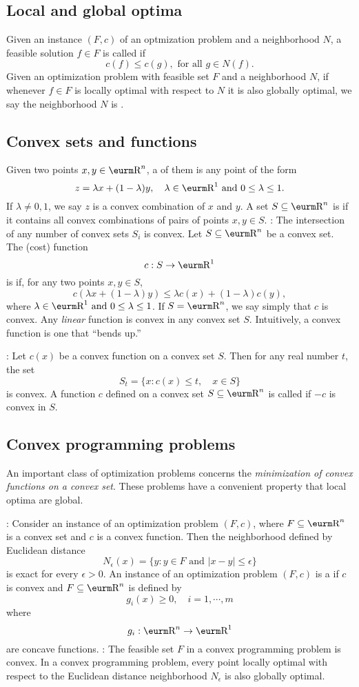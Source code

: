 \documentclass{myproc}
\begin{document}
\subsection{Local and global optima}
\bit
\w Given an instance $(F, c)$ of an optmization problem and a
neighborhood $N$, a feasible solution $f \in F$ is called  if  
	\[ c(f) \le c(g), \mbox{\ for all\ } g \in N(f). \]
\w Given an optimization problem with feasible set $F$ and a
neighborhood $N$, if whenever $f \in F$ is locally optimal with
respect to $N$ it is also globally optimal, we say the neighborhood
$N$ is . 
\eit
\subsection{Convex sets and functions}
\bit
\w Given two points $x, y \in \R^n$, a  of them
is any point of the form 
	\[ z = \lambda{x} + (1-\lambda)y,\quad \lambda \in \R^1 \mbox{\ and\ }
	0 \le \lambda \le 1.\]
	If $\lambda \ne 0, 1$, we say $z$ is a  convex
combination of $x$ and $y$. 
\w A set $S \subseteq \R^n$ is  if it contains all convex
combinations of pairs of points $x, y \in S$. 
: 
  The intersection of any number of convex sets $S_i$ is convex.
\w Let $S \subseteq \R^n$ be a convex set. The (cost) function
	\[ c: S \rightarrow \R^1 \]
is  if, for any two points $x, y \in S$,
\[ c(\lambda{x} + (1-\lambda)y) \le \lambda c(x) + (1-\lambda)c(y),\]
where $\lambda \in \R^1 \mbox{\ and\ } 0 \le \lambda \le 1$.
If $S = \R^n$, we say simply that $c$ is convex.
	\w Any {\em linear\/} function is convex in any convex set $S$.
	\w Intuitively, a convex function is one that ``bends up.''

: 
 Let $c(x)$ be a convex function on a convex set $S$. Then for any
real number $t$, the set  
\[S_t = \{x : c(x) \le t, \quad x \in S\}\]
is convex.
\w A function $c$ defined on a convex set $S \subseteq \R^n$ is called
 if $-c$ is convex in $S$.
\eit
\subsection{Convex programming problems}
\bit
\w An important class of optimization problems concerns the {\em
minimization of convex functions on a convex set\/}.
These problems have a convenient property that local optima
are global.

: 
Consider an instance of an optimization problem $(F, c)$, where
$F \subseteq \R^n$ is a convex set and $c$ is a convex function.
Then the neighborhood defined by Euclidean distance
\[ N_\epsilon(x) = \{y: y \in F \mbox{\ and\ } |x - y| \le
\epsilon\}\]
is exact for every $\epsilon > 0$.
\w An instance of an optimization problem $(F, c)$ is a  if $c$ is convex and $F \subseteq \R^n$ is
defined by
\[ g_i(x) \ge 0, \quad i = 1, \cdots, m\]
where
\[ g_i:\R^n \rightarrow \R^1\]
are concave functions.
:
 The feasible set $F$ in a convex programming problem is convex.
\w In a convex programming problem, every point locally optimal with
respect to the Euclidean distance neighborhood $N_\epsilon$ is also
globally optimal.
\eit
\end{document}
